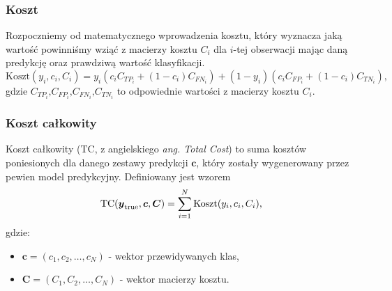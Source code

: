 \documentclass[inzynierska]{pwr_wmat_praca_dyplomowa}
\theoremstyle{plain}
\numberwithin{theorem}{chapter}
\theoremstyle{definition}
\numberwithin{theorem}{chapter}
\begin{document}
\subsubsection{Koszt}
Rozpoczniemy od matematycznego wprowadzenia kosztu, który wyznacza jaką wartość powinniśmy wziąć z macierzy kosztu $C_i$ dla $i$-tej obserwacji mając daną predykcję oraz prawdziwą wartość klasyfikacji.
$$ \text{Koszt}(y_i, c_i, C_i) = y_i \left(c_i C_{TP_i} + (1-c_i)C_{FN_i}\right) + (1-y_i)\left(c_i C_{FP_i} + (1-c_i)C_{TN_i}\right) \text{,}$$
gdzie $C_{TP_{i}}\text{,} C_{FP_{i}}\text{,} C_{FN_{i}}\text{,} C_{TN_{i}}$ to odpowiednie wartości z macierzy kosztu $C_i$.

\subsubsection{Koszt całkowity}
Koszt całkowity (TC, z angielskiego \textit{ang. Total Cost}) to suma kosztów poniesionych dla danego zestawy predykcji $\boldsymbol{c}$, który zostały wygenerowany przez pewien model predykcyjny. Definiowany jest wzorem
\begin{equation}
	\label{koszt-calkowity}
	\text{TC}(\boldsymbol{y}_{\text{true}}, \boldsymbol{c}, \boldsymbol{C}) = \sum_{i=1}^{N}\text{Koszt}(y_i, c_i, C_i) \text{,}
\end{equation} 
gdzie:
\begin{itemize}
	\item $\boldsymbol{c} = (c_1, c_2, \dots, c_N) $ - wektor przewidywanych klas,
	\item $\boldsymbol{C} = (C_1, C_2, \dots, C_N) $ - wektor macierzy kosztu.
\end{itemize}
\end{document}
